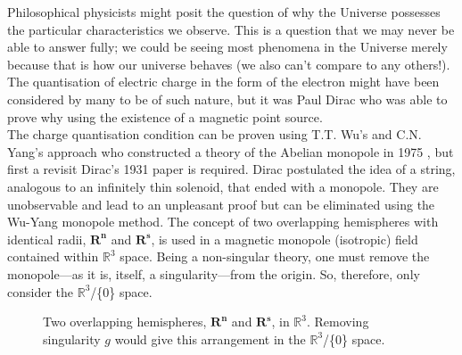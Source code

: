 \documentclass[twocolumn, 10pt]{article}
\begin{document}
Philosophical physicists might posit the question of why the Universe possesses the particular characteristics we observe. This is a question that we may never be able to answer fully; we could be seeing most phenomena in the Universe merely because that is how our universe behaves (we also can't compare to any others!). The quantisation of electric charge in the form of the electron might have been considered by many to be of such nature, but it was Paul Dirac who was able to prove why using the existence of a magnetic point source. \\
\indent The charge quantisation condition can be proven using T.T. Wu's and C.N. Yang's approach who constructed a theory of the Abelian monopole in 1975 \cite{WuMonopoleYang}, but first a revisit Dirac's 1931 paper is required. Dirac postulated the idea of a string, analogous to an infinitely thin solenoid, that ended with a monopole. They are unobservable and lead to an unpleasant proof but can be eliminated using the Wu-Yang monopole method.  The concept of two overlapping hemispheres with identical radii, $\mathbf{R^n}$ and $\mathbf{R^s}$, is used in a magnetic monopole (isotropic) field contained within $\mathbb{R}^3$ space. Being a non-singular theory, one must remove the monopole---as it is, itself, a singularity---from the origin. So, therefore, only consider the $\mathbb{R}^3$/\{$0$\} space.\\
\begin{figure}[t]
\centering
{}
\caption{Two overlapping hemispheres, $\mathbf{R^n}$ and $\mathbf{R^s}$, in $\mathbb{R}^3$. Removing singularity $g$ would give this arrangement in the $\mathbb{R}^3$/\{$0$\} space.}
\end{figure}
\end{document}
